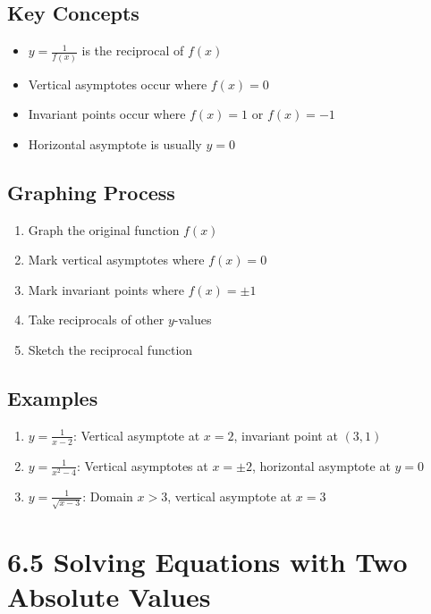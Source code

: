 \documentclass[12pt]{article}
\begin{document}
\subsection*{Key Concepts}
\begin{tcolorbox}[colback=lightgray,colframe=primary,title=Reciprocal Functions]
    \begin{itemize}
        \item $y = \frac{1}{f(x)}$ is the reciprocal of $f(x)$
        \item Vertical asymptotes occur where $f(x) = 0$
        \item Invariant points occur where $f(x) = 1$ or $f(x) = -1$
        \item Horizontal asymptote is usually $y = 0$
    \end{itemize}
\end{tcolorbox}

\subsection*{Graphing Process}
\begin{enumerate}
    \item Graph the original function $f(x)$
    \item Mark vertical asymptotes where $f(x) = 0$
    \item Mark invariant points where $f(x) = \pm 1$
    \item Take reciprocals of other $y$-values
    \item Sketch the reciprocal function
\end{enumerate}

\subsection*{Examples}
\begin{enumerate}
    \item $y = \frac{1}{x-2}$: Vertical asymptote at $x = 2$, invariant point at $(3,1)$
    \item $y = \frac{1}{x^2-4}$: Vertical asymptotes at $x = \pm 2$, horizontal asymptote at $y = 0$
    \item $y = \frac{1}{\sqrt{x-3}}$: Domain $x > 3$, vertical asymptote at $x = 3$
\end{enumerate}

\section{6.5 Solving Equations with Two Absolute Values}
\end{document}
